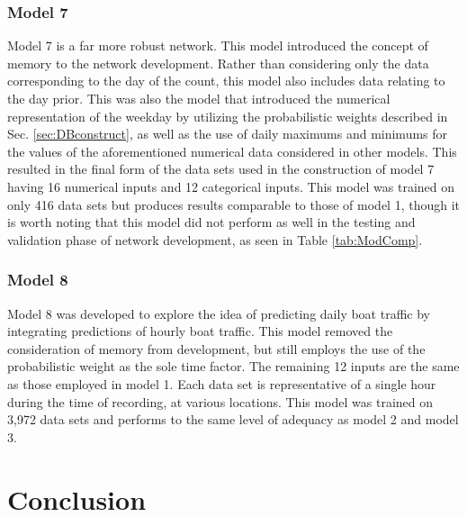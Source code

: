 \documentclass[
10pt, %
letterpaper, %
twoside, %
headinclude,footinclude, %
BCOR5mm, %
]{scrartcl}
\begin{document}
\subsubsection{Model 7}

Model 7 is a far more robust network. This model introduced the concept of memory to the network development. Rather than considering only the data corresponding to the day of the count, this model also includes data relating to the day prior. This was also the model that introduced the numerical representation of the weekday by utilizing the probabilistic weights described in Sec. \ref{sec:DBconstruct}, as well as the use of daily maximums and minimums for the values of the aforementioned numerical data considered in other models. This resulted in the final form of the data sets used in the construction of model 7 having 16 numerical inputs and 12 categorical inputs. This model was trained on only 416 data sets but produces results comparable to those of model 1, though it is worth noting that this model did not perform as well in the testing and validation phase of network development, as seen in Table \ref{tab:ModComp}.

\subsubsection{Model 8}

Model 8 was developed to explore the idea of predicting daily boat traffic by integrating predictions of hourly boat traffic. This model removed the consideration of memory from development, but still employs the use of the probabilistic weight as the sole time factor. The remaining 12 inputs are the same as those employed in model 1. Each data set is representative of a single hour during the time of recording, at various locations. This model was trained on 3,972 data sets and performs to the same level of adequacy as model 2 and model 3.

\section{Conclusion}
\end{document}
